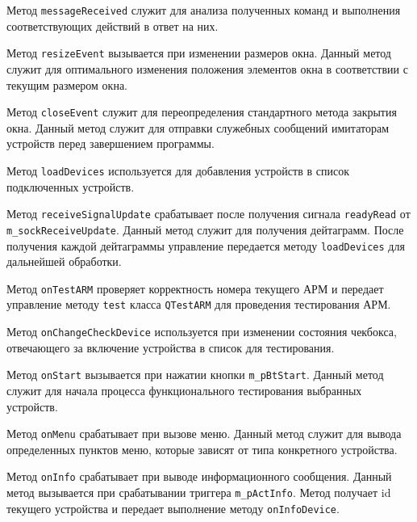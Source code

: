 \begin{enum}
	\item Метод \texttt{messageReceived} служит для анализа полученных команд и выполнения соответствующих действий
		в ответ на них.

	\item Метод \texttt{resizeEvent} вызывается при изменении размеров окна. Данный метод служит для оптимального
		изменения положения элементов окна в соответствии с текущим размером окна.

	\item Метод \texttt{closeEvent} служит для переопределения стандартного метода закрытия окна. Данный метод
		служит для отправки служебных сообщений имитаторам устройств перед завершением программы.

	\item Метод \texttt{loadDevices} используется для добавления устройств в список подключенных устройств.

	\item Метод \texttt{receiveSignalUpdate} срабатывает после получения сигнала \texttt{readyRead} от
		\texttt{m\_sockReceiveUpdate}. Данный метод служит для получения дейтаграмм. После получения каждой
		дейтаграммы управление передается методу \texttt{loadDevices} для дальнейшей обработки.

	\item Метод \texttt{onTestARM} проверяет корректность номера текущего АРМ и передает управление методу
		\texttt{test} класса \texttt{QTestARM} для проведения тестирования АРМ.

	\item Метод \texttt{onChangeCheckDevice} используется при изменении состояния чекбокса, отвечающего за включение
		устройства в список для тестирования.

	\item Метод \texttt{onStart} вызывается при нажатии кнопки \texttt{m\_pBtStart}. Данный метод служит для начала
		процесса функционального тестирования выбранных устройств.

	\item Метод \texttt{onMenu} срабатывает при вызове меню. Данный метод служит для вывода определенных пунктов
		меню, которые зависят от типа конкретного устройства.

	\item Метод \texttt{onInfo} срабатывает при выводе информационного сообщения. Данный метод вызывается при
		срабатывании триггера \texttt{m\_pActInfo}. Метод получает id текущего устройства и передает выполнение
		методу \texttt{onInfoDevice}.


\end{enum}
